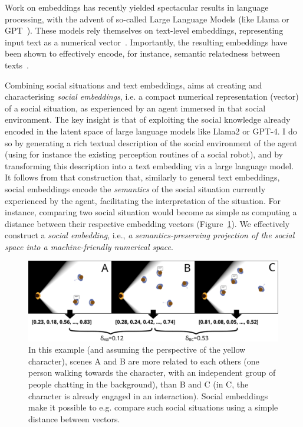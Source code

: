 Work on embeddings has recently yielded spectacular results in language
processing, with the advent of so-called Large Language Models (like Llama or
GPT~\cite{devlin2019bert,wolf2020transformers}). These models rely themselves on
text-level embeddings, representing input text as a numerical
vector~\cite{reimers2019sentencebert,muennighoff2022sgpt}. Importantly, the
resulting embeddings have been shown to effectively encode, for instance,
semantic relatedness between texts~\cite{thakur2021beir}.

Combining social situations and text embeddings, \project aims at creating and
characterising \emph{social embeddings}, i.e. a compact numerical
representation (vector) of a social situation, as experienced by an agent
immersed in that social environment. 
The key insight is that of exploiting the social knowledge already encoded in
the latent space of large language models like Llama2 or GPT-4. I do so by
generating a rich textual description of the social environment of the agent
(using for instance the existing perception routines of a social robot), and by
transforming this description into a text embedding via a large language model.
It follows from that construction that, similarly to general text embeddings,
social embeddings encode the \emph{semantics} of the social situation currently
experienced by the agent, facilitating the interpretation of the situation. For
instance, comparing two social situation would become as simple as computing a
distance between their respective embedding vectors
(Figure~\ref{fig:social-embeddings}).  We effectively construct a \emph{social
embedding}, i.e., \emph{a semantics-preserving projection of the social space into a machine-friendly
numerical space}.


\begin{figure}[H]
    \centering
    \includegraphics[width=0.9\linewidth]{figs/social-embeddings}
    \caption{In this example (and assuming the perspective of the yellow
    character), scenes A and B  are more related to each others (one person
    walking towards the character, with an independent group of people chatting
    in the background), than B and C (in C, the character is already engaged in
    an interaction).  Social embeddings make it possible to e.g. compare such
    social situations using a simple distance between vectors.}

    \label{fig:social-embeddings}
\end{figure}


